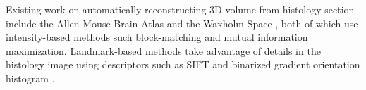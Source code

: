 \documentclass{llncs}
\begin{document}

Existing work on automatically reconstructing 3D volume from histology section include the Allen Mouse Brain Atlas \cite{lein2007genome, yushkevich20063d} and the Waxholm Space \cite{johnson2010waxholm}, both of which use intensity-based methods such block-matching \cite{ourselin2001reconstructing, roberts2012toward} and mutual information maximization. Landmark-based methods take advantage of details in the histology image using descriptors such as SIFT\cite{sun2012nearly} and binarized gradient orientation histogram \cite{kurkure2011landmark}.

\end{document}
